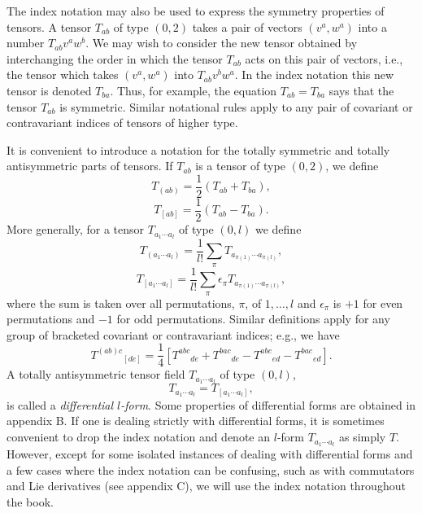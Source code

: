 The index notation may also be used to express the symmetry properties of tensors.
A tensor \(T_{ab}\) of type \((0,2)\) takes a pair of vectors \((v^a,w^a)\) into a
number \(T_{ab}v^aw^b\).  We may wish to consider the new tensor obtained by
interchanging the order in which the tensor \(T_{ab}\) acts on this pair of vectors,
i.e., the tensor which takes \((v^a,w^a)\) into \(T_{ab}v^bw^a\).  In the index
notation this new tensor is denoted \(T_{ba}\).  Thus, for example, the equation
\(T_{ab}=T_{ba}\) says that the tensor \(T_{ab}\) is symmetric.  Similar notational
rules apply to any pair of covariant or contravariant indices of tensors of higher
type.

It is convenient to introduce a notation for the totally symmetric and totally
antisymmetric parts of tensors.  If \(T_{ab}\) is a tensor of type \((0,2)\), we
define
\begin{equation}
  T_{(ab)}=\frac{1}{2}\left(T_{ab}+T_{ba}\right) ,
  \tag{2.4.1}\label{eq:2.4.1}
\end{equation}
\begin{equation}
  T_{[ab]}=\frac{1}{2}\left(T_{ab}-T_{ba}\right) .
  \tag{2.4.2}\label{eq:2.4.2}
\end{equation}
More generally, for a tensor \(T_{a_1\cdots a_l}\) of type \((0,l)\) we define
\begin{equation}
  T_{(a_1\cdots a_l)}=
  \frac{1}{l!}\sum_\pi T_{a_{\pi(1)}\cdots a_{\pi(l)}} ,
  \tag{2.4.3}\label{eq:2.4.3}
\end{equation}
\begin{equation}
  T_{[a_1\cdots a_l]}=
  \frac{1}{l!}\sum_\pi\epsilon_\pi T_{a_{\pi(1)}\cdots a_{\pi(l)}} ,
  \tag{2.4.4}\label{eq:2.4.4}
\end{equation}
where the sum is taken over all permutations, \(\pi\), of \(1,\ldots,l\) and
\(\epsilon_\pi\) is \(+1\) for even permutations and \(-1\) for odd permutations.
Similar definitions apply for any group of bracketed covariant or contravariant
indices; e.g., we have
\begin{equation}
  T^{(ab)c}{}_{[de]}=
  \frac{1}{4}\left[T^{abc}{}_{de}+T^{bac}{}_{de}
  -T^{abc}{}_{ed}-T^{bac}{}_{ed}\right] .
  \tag{2.4.5}\label{eq:2.4.5}
\end{equation}
A totally antisymmetric tensor field \(T_{a_1\cdots a_l}\) of type \((0,l)\),
\begin{equation}
  T_{a_1\cdots a_l}=T_{[a_1\cdots a_l]} ,
  \tag{2.4.6}\label{eq:2.4.6}
\end{equation}
is called a \emph{differential \(l\)-form}.  Some properties of differential forms
are obtained in appendix B.  If one is dealing strictly with differential forms, it
is sometimes convenient to drop the index notation and denote an \(l\)-form
\(T_{a_1\cdots a_l}\) as simply \(T\).  However, except for some isolated
instances of dealing with differential forms and a few cases where the index
notation can be confusing, such as with commutators and Lie derivatives (see
appendix C), we will use the index notation throughout the book.
